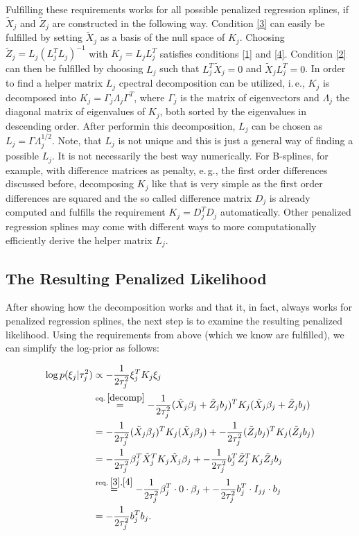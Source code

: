 \documentclass[12pt]{article}
\begin{document}
Fulfilling these requirements works for all possible penalized regression splines, if $\tilde{X}_j$ and $\tilde{Z}_j$ are constructed in the following way. Condition \ref{3} can easily be fulfilled by setting $\tilde{X}_j$ as a basis of the null space of $K_j$. Choosing $\tilde{Z}_j =L_j (L_j^T L_j)^{-1}$ with $K_j =L_j L_j^T$ satisfies conditions \ref{1} and \ref{4}.  Condition \ref{2} can then be fulfilled by choosing $L_j$ such that $L_j^T\tilde{X}_j = 0$ and $\tilde{X}_jL_j^T = 0$. 
In order to find a helper matrix $L_j$ cpectral decomposition can be utilized, i.\,e., $K_j$ is decomposed into $K_j = \Gamma_j \Lambda_j \Gamma^T$, where $\Gamma_j$ is the matrix of eigenvectors and $\Lambda_j$ the diagonal matrix of eigenvalues of $K_j$, both sorted by the eigenvalues in descending order. After performin this decomposition, $L_j$ can be chosen as $L_j = \Gamma \Lambda_j^{1/2}$. Note, that $L_j$ is not unique and this is just a general way of finding a possible $L_j$. It is not necessarily the best way numerically. For B-splines, for example, with difference matrices as penalty, e.\,g., the first order differences discussed before, decomposing $K_j$ like that is very simple as the first order differences are squared and the so called difference matrix $D_j$ is already computed and fulfills the requirement $K_j = D_j^TD_j$  automatically. Other penalized regression splines may come with different ways to more computationally efficiently derive the helper matrix $L_j$.

\subsection{The Resulting Penalized Likelihood}

After showing how the decomposition works and that it, in fact, always works for penalized regression splines, the next step is to examine the resulting penalized likelihood. Using the requirements from above (which we know are fulfilled), we can simplify the log-prior as follows:


\begin{align*}
\log p(\xi_j|\tau_j^2)  &\propto -\frac{1}{2\tau^2_j} \xi_j^TK_j \xi_j\\ 
&\overset{\text{eq.}\:\ref{decomp}}{=} -\frac{1}{2\tau^2_j} (\tilde{X}_j \beta_j + \tilde{Z}_j b_j)^TK_j (\tilde{X}_j \beta_j + \tilde{Z}_j b_j) \\
&= -\frac{1}{2\tau^2_j} (\tilde{X}_j \beta_j)^TK_j (\tilde{X}_j \beta_j) +
-\frac{1}{2\tau^2_j} (\tilde{Z}_j b_j)^TK_j (\tilde{Z}_j b_j)\\
&= -\frac{1}{2\tau^2_j} \beta_j^T \tilde{X}_j^T K_j \tilde{X}_j \beta_j +
-\frac{1}{2\tau^2_j} b_j^T \tilde{Z}_j^T K_j \tilde{Z}_j b_j\\
&\overset{\text{req.}\:\ref{3},\ref{4}}{=} -\frac{1}{2\tau^2_j} \beta_j^T \cdot 0 \cdot \beta_j +
-\frac{1}{2\tau^2_j} b_j^T \cdot I_{jj} \cdot b_j\\
&= -\frac{1}{2\tau_j^2} b_j^T b_j.
\end{align*}
\end{document}
